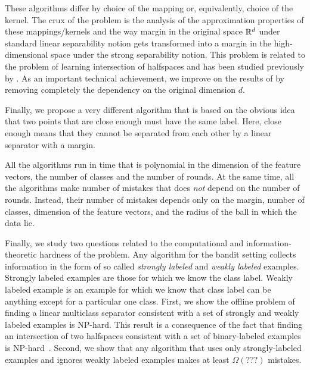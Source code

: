 These algorithms differ by choice of the mapping or, equivalently, choice of the
kernel. The crux of the problem is the analysis of the approximation properties
of these mappings/kernels and the way margin in the original space $\mathbb{R}^d$ under
standard linear separability notion gets transformed into a margin in the
high-dimensional space under the strong separability notion. This problem is
related to the problem of learning intersection of halfspaces and has been
studied previously by \citet{Klivans-Servedio-2008}. As an important technical
achievement, we improve on the results of \citet{Klivans-Servedio-2008} by
removing completely the dependency on the original dimension $d$.

Finally, we propose a very different algorithm that is based on the obvious idea
that two points that are close enough must have the same label. Here, close
enough means that they cannot be separated from each other by a linear separator
with a margin.

All the algorithms run in time that is polynomial in the dimension of the
feature vectors, the number of classes and the number of rounds. At the same
time, all the algorithms make number of mistakes that does \emph{not} depend
on the number of rounds. Instead, their number of mistakes depends only on the
margin, number of classes, dimension of the feature vectors, and the radius of
the ball in which the data lie.

Finally, we study two questions related to the computational and
information-theoretic hardness of the problem. Any algorithm for the bandit
setting collects information in the form of so called \emph{strongly labeled}
and \emph{weakly labeled} examples. Strongly labeled examples are those for
which we know the class label. Weakly labeled example is an example for which we
know that class label can be anything except for a particular one class. First,
we show the offline problem of finding a linear multiclass separator consistent
with a set of strongly and weakly labeled examples is NP-hard. This result is a
consequence of the fact that finding an intersection of two halfspaces
consistent with a set of binary-labeled examples is
NP-hard~\citep{Blum-Rivest-1993}. Second, we show that any algorithm that uses
only strongly-labeled examples and ignores weakly labeled examples makes at
least $\Omega(???)$ mistakes.
